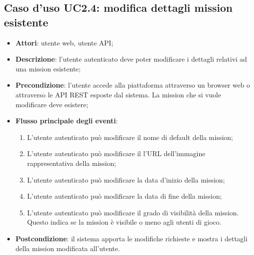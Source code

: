 \subsection{Caso d'uso UC2.4: modifica dettagli mission esistente}
\begin{itemize}
\item \textbf{Attori}: utente web, utente API;
\item \textbf{Descrizione}: l'utente autenticato deve poter modificare i dettagli relativi ad una mission esistente; 
      \item \textbf{Precondizione}: l'utente accede alla piattaforma attraverso un browser web o attraverso le API REST esposte dal sistema. La mission che si vuole modificare deve esistere;

        \item \textbf{Flusso principale degli eventi}:
          \begin{enumerate}
          \item L'utente autenticato può modificare il nome di default della mission;
          \item L'utente autenticato può modificare il l'URL dell'immagine rappresentativa della mission;
          \item L'utente autenticato può modificare la data d'inizio della mission;
          \item L'utente autenticato può modificare la data di fine della mission;
          \item L'utente autenticato può modificare il grado di visibilità della mission. Questo indica se la mission è visibile o meno agli utenti di gioco.

      \end{enumerate}
    \item \textbf{Postcondizione}: il sistema apporta le modifiche richieste e mostra i dettagli della mission modificata all'utente.
  \end{itemize}
\hypertarget{UC2.5}{}
